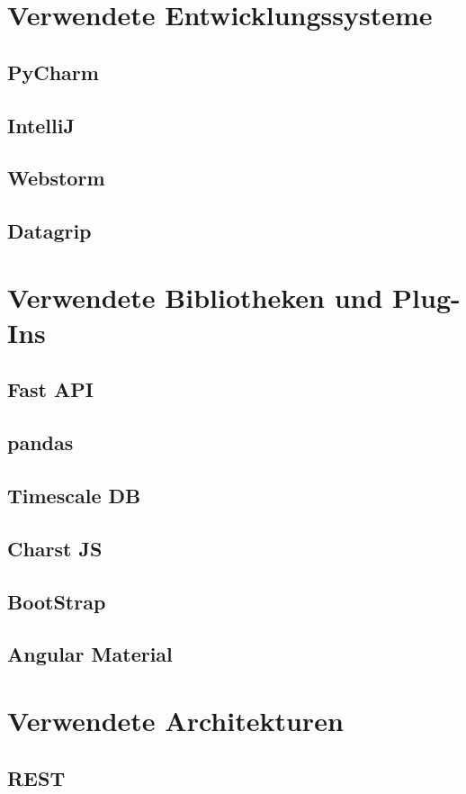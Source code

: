 \documentclass{report}
\begin{document}
\section{Verwendete Entwicklungssysteme}
\subsection{PyCharm}
\subsection{IntelliJ}
\subsection{Webstorm}
\subsection{Datagrip}
\section{Verwendete Bibliotheken und Plug-Ins }
\subsection{Fast API}
\subsection{pandas}
\subsection{Timescale DB}
\subsection{Charst JS}
\subsection{BootStrap}
\subsection{Angular Material}
\section{Verwendete Architekturen}
\subsection{REST}
\end{document}
